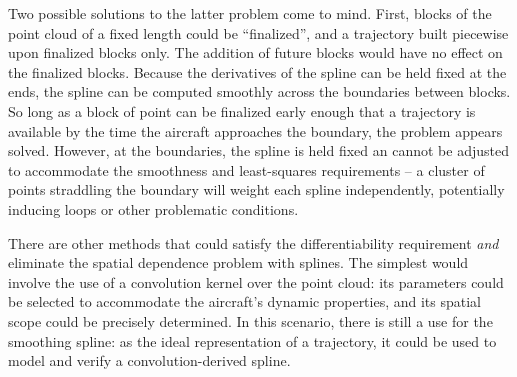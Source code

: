 \documentclass[doc]{apa6}
\begin{document}
Two possible solutions to the latter problem come to mind. First, blocks of the point cloud of a fixed length could be ``finalized'', and a trajectory built piecewise upon finalized blocks only. The addition of future blocks would have no effect on the finalized blocks. Because the derivatives of the spline can be held fixed at the ends, the spline can be computed smoothly across the boundaries between blocks. So long as a block of point can be finalized early enough that a trajectory is available by the time the aircraft approaches the boundary, the problem appears solved. However, at the boundaries, the spline is held fixed an cannot be adjusted to accommodate the smoothness and least-squares requirements -- a cluster of points straddling the boundary will weight each spline independently, potentially inducing loops or other problematic conditions.

There are other methods that could satisfy the differentiability requirement \emph{and} eliminate the spatial dependence problem with splines. The simplest would involve the use of a convolution kernel over the point cloud: its parameters could be selected to accommodate the aircraft's dynamic properties, and its spatial scope could be precisely determined. In this scenario, there is still a use for the smoothing spline: as the ideal representation of a trajectory, it could be used to model and verify a convolution-derived spline.


\clearpage

\printbibliography
\end{document}
